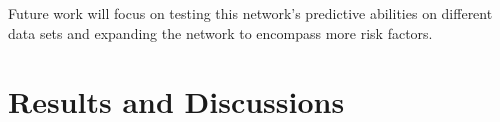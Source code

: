 \documentclass[letterpaper]{article}
\begin{document}
Future work will focus on testing this network's predictive abilities on different data sets and expanding the network to encompass more risk factors. 

\section{Results and Discussions}






%
%
%
%
%
%
%




\end{document}
